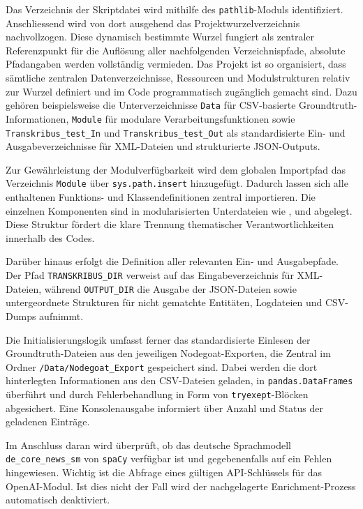 \documentclass[12pt, a4paper, ngerman, bidi=default]{article}
\newcommand{\code}[1]{\colorbox{VeryLightGray}{\texttt{#1}}} %
\begin{document}
Das Verzeichnis der Skriptdatei wird mithilfe des \code{pathlib}-Moduls identifiziert. Anschliessend wird von dort ausgehend das 
Projektwurzelverzeichnis nachvollzogen. Diese dynamisch bestimmte Wurzel fungiert als zentraler Referenzpunkt für die Auflösung 
aller nachfolgenden Verzeichnispfade, absolute Pfadangaben werden vollständig vermieden.  
Das Projekt ist so organisiert, dass sämtliche zentralen Datenverzeichnisse, Ressourcen und Modulstrukturen relativ
zur Wurzel definiert und im Code programmatisch zugänglich gemacht sind. Dazu gehören beispielsweise die 
Unterverzeichnisse \code{Data} für CSV-basierte Groundtruth-Informationen, \code{Module} für modulare 
Verarbeitungsfunktionen sowie \code{Transkribus\_test\_In} und \code{Transkribus\_test\_Out} als standardisierte 
Ein- und Ausgabeverzeichnisse für XML-Dateien und strukturierte JSON-Outputs.


Zur Gewährleistung der Modulverfügbarkeit wird dem globalen Importpfad das Verzeichnis \code{Module} über \code{sys.path.insert} hinzugefügt. 
Dadurch lassen sich alle enthaltenen Funktions- und Klassendefinitionen zentral importieren. Die einzelnen Komponenten sind in 
modularisierten Unterdateien wie ,  und  abgelegt. 
Diese Struktur fördert die klare Trennung thematischer Verantwortlichkeiten innerhalb des Codes.

Darüber hinaus erfolgt die Definition aller relevanten Ein- und Ausgabepfade. Der 
Pfad \code{TRANSKRIBUS\_DIR} verweist auf das Eingabeverzeichnis für XML-Dateien, während 
\code{OUTPUT\_DIR} die Ausgabe der JSON-Dateien sowie untergeordnete Strukturen für nicht 
gematchte Entitäten, Logdateien und CSV-Dumps aufnimmt.

Die Initialisierungslogik umfasst ferner das standardisierte Einlesen der Groundtruth-Dateien aus den 
jeweiligen Nodegoat-Exporten, die Zentral im Ordner \code{/Data/Nodegoat\_Export} gespeichert sind. 
Dabei werden die dort hinterlegten Informationen aus den 
CSV-Dateien geladen, in \code{pandas.DataFrames} überführt und durch Fehlerbehandlung in Form von
\code{try\-exept}-Blöcken abgesichert. 
Eine Konsolenausgabe informiert über Anzahl und Status der geladenen Einträge.

Im Anschluss daran wird überprüft, ob das deutsche Sprachmodell 
\code{de\_core\_news\_sm} von \code{spaCy} verfügbar ist und gegebenenfalls auf ein Fehlen hingewiesen. 
Wichtig ist die Abfrage eines gültigen 
API-Schlüssels für das OpenAI-Modul. Ist dies nicht der Fall wird der nachgelagerte Enrichment-Prozess 
automatisch deaktiviert.
\end{document}
